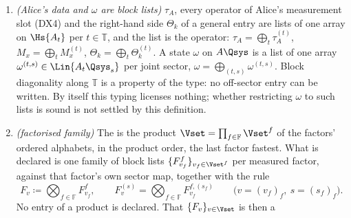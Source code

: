 \begin{definition}
\begin{enumerate}[label=(DX\arabic*),leftmargin=3.2em]
\begin{equation}\label{eq:productmap}
  \Qsys=\bigotimes_{f\in\mathbb{F}}\Qsys_f,\qquad
  \SecSet=\prod_{f\in\mathbb{F}}\SecSet^{f},\qquad
  \Hs{\Qsys_s}=\bigotimes_{f}\Hs{\Qsys_{f,s_f}},\qquad
  \Pi_s=\bigotimes_f\Pi^{f}_{s_f},\qquad d_s=\prod_fd_{f,s_f},
\end{equation}
all products in the order of $\mathbb{F}$, and $\SecSet$ ordered with the
last factor fastest, a product identifier being the factors' identifiers
joined in that order. Each pair $(t,s)\in\mathbb{T}\times\SecSet$ is a
;
the joint sectors are ordered with $t$ slowest, and
$\Hs{A\Qsys}=\bigoplus_{(t,s)}\Hs{A_t}\otimes\Hs{\Qsys_s}$, the $A$ index
first inside a block. The party partition labels $A$ with the party of the
factor tagged $A$, where there is one, and otherwise with the party label it
declares for $A$, as in the basic format; and it labels every tensor factor of
$\Hs{\Qsys_{f,s_f}}$ with the party of $f$.
\item \emph{(Alice's data and $\omega$ are block lists)} $\tau_A$, every
operator of Alice's measurement slot (DX4) and the right-hand side $\Theta_k$
of a general entry are lists of one array on $\Hs{A_t}$ per
$t\in\mathbb{T}$, and the list is the operator:
$\tau_A=\bigoplus_t\tau_A^{(t)}$, $M_x=\bigoplus_tM_x^{(t)}$,
$\Theta_k=\bigoplus_t\Theta_k^{(t)}$. A state $\omega$ on $A\Qsys$ is a list
of one array $\omega^{(t,s)}\in\Lin{A_t\Qsys_s}$ per joint sector,
$\omega=\bigoplus_{(t,s)}\omega^{(t,s)}$. Block diagonality along
$\mathbb{T}$ is a property of the type: no off-sector entry can be written.
By itself this typing licenses nothing; whether restricting $\omega$ to such
lists is sound is not settled by this definition.
\item \emph{(factorised family)} The  is the product
$\Vset=\prod_{f\in\mathbb{F}}\Vset^{f}$ of the factors' ordered alphabets, in
the product order, the last factor fastest. What is declared is one family of
block lists $\{F^{f}_{v_f}\}_{v_f\in\Vset^{f}}$ per measured factor, against
that factor's own sector map, together with the rule
\begin{equation}\label{eq:productfamily}
  F_v\coloneqq\bigotimes_{f\in\mathbb{F}}F^{f}_{v_f},\qquad
  F^{(s)}_v=\bigotimes_{f\in\mathbb{F}}F^{f,(s_f)}_{v_f}
  \qquad\big(v=(v_f)_f,\ s=(s_f)_f\big).
\end{equation}
No entry of a product is declared. That $\{F_v\}_{v\in\Vset}$ is then a

\end{enumerate}
\end{definition}

